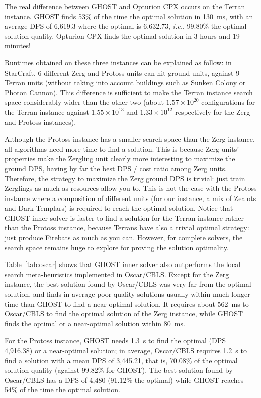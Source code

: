 \documentclass[journal]{IEEEtran}
\newcommand{\ghost}{\textsc{GHOST}\xspace}
\newcommand{\ie}{\textit{i.e.}}
\begin{document}
The  real difference  between \ghost  and Opturion  CPX occurs  on the
Terran  instance. \ghost finds  53\% of  the time  the optimal
solution in 130~ms, with an average DPS of 6,619.3 where the
optimal  is  6,632.73,  \ie,  99.80\% the  optimal  solution  quality.
Opturion CPX finds the optimal solution in 3 hours and 19 minutes!

Runtimes obtained on these three instances can be explained as follow:
in StarCraft, 6 different Zerg and Protoss units can hit ground units,
against 9 Terran units (without taking into account buildings
such  as  Sunken  Colony  or   Photon  Cannon).   This  difference  is
sufficient to make the Terran instance search space considerably wider
than the  other two (about  $1.57 \times 10^{20}$  configurations for
the Terran  instance against  $1.55 \times  10^{13}$ and  $1.33 \times
10^{12}$ respectively for the Zerg and Protoss instances).

Although the Protoss instance has a smaller search space than the Zerg
instance, all algorithms  need more time to find a  solution.  This is
because Zerg  units' properties make  the Zergling unit  clearly more
interesting to maximize  the ground DPS, having by far  the best DPS /
cost ratio among  Zerg units.  Therefore, the strategy  to maximize the
Zerg ground DPS is trivial: just  train Zerglings as much as resources
allow you to. This  is not the case with the  Protoss instance where a
composition of different units (for our instance, a mix of Zealots and
Dark Templars) is required to  reach the optimal solution. Notice that
\ghost  inner solver is  faster to find  a solution for  the Terran
instance rather  than the  Protoss instance,  because Terrans
have also a trivial optimal strategy: just produce Firebats as much as
you can. However,  for complete solvers, the search  space remains huge
to explore for proving the solution optimality.

Table~\ref{tab:oscar} shows that \ghost  inner solver also outperforms
the local search meta-heuristics implemented in Oscar/CBLS. Except for
the Zerg instance, the best solution  found by Oscar/CBLS was very far
from the optimal solution, and  finds in average poor-quality solutions
usually within  much longer  time than \ghost  to find  a near-optimal
solution. It  requires about 562~ms  to Oscar/CBLS to find  the optimal
solution of  the Zerg  instance, while  \ghost finds  the optimal  or a
near-optimal solution within 80~ms.

For the Protoss instance, \ghost needs 1.3~s to find the optimal (DPS =
4,916.38) or a near-optimal  solution; in average, Oscar/CBLS requires
1.2~s to find a solution with a  mean DPS of 3,445.21, that is, 70.08\%
of the optimal solution quality (against 99.82\% for \ghost). The best
solution found by Oscar/CBLS has a  DPS of 4,480 (91.12\% the optimal)
while \ghost reaches 54\% of the time the optimal solution.
\end{document}
